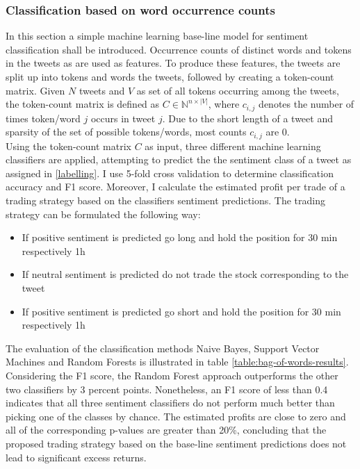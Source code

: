 \documentclass[a4paper,12pt]{article}%
\begin{document}
\subsubsection{Classification based on word occurrence counts}
In this section a simple machine learning base-line model for sentiment classification shall be introduced. Occurrence counts of distinct words and tokens in the tweets as are used as features. To produce these features, the tweets are split up into tokens and words the tweets, followed by creating a token-count matrix. Given $N$ tweets and $V$ as set of all tokens occurring among the tweets, the token-count matrix is defined as $C \in \mathbb{N}^{n \times |V|}$, where $c_{i,j}$ denotes the number of times token/word $j$ occurs in tweet $j$.  Due to the short length of a tweet and sparsity of the set of possible tokens/words, most counts $c_{i,j}$ are 0.\\

Using the token-count matrix $C$ as input, three different machine learning classifiers are applied, attempting to predict the the sentiment class of a tweet as assigned in \ref{labelling}. I use 5-fold cross validation to determine classification accuracy and F1 score. Moreover, I calculate the estimated profit per trade of a trading strategy based on the classifiers sentiment predictions. The trading strategy can be formulated the following way: 
\begin{itemize}
\item If positive sentiment is predicted go long and hold the position  for 30 min respectively 1h
\item If neutral sentiment is predicted do not trade the stock corresponding to the tweet
\item If positive sentiment is predicted go short and hold the position  for 30 min respectively 1h
\end{itemize}


The evaluation of the classification methods Naive Bayes, Support Vector Machines and Random Forests is illustrated in table \ref{table:bag-of-words-results}. Considering the F1 score, the Random Forest approach outperforms the other two classifiers by 3 percent points. Nonetheless, an F1 score of less than 0.4 indicates that all three sentiment classifiers do not perform much better than picking one of the classes by chance.
The estimated profits are close to zero and all of the corresponding p-values are greater than 20\%, concluding that the proposed trading strategy based on the base-line sentiment predictions does not lead to  significant excess returns.
\end{document}
